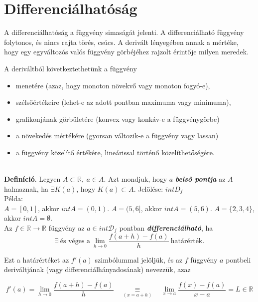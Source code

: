 \documentclass[12pt,margin=0px]{article}
\newcommand\ddfrac[2]{\frac{\displaystyle #1}{\displaystyle #2}}
\begin{document}
    \section*{Differenciálhatóság}

    \noindent A differenciálhatóság a függvény simaságát jelenti. A differenciálható függvény folytonos, és nincs rajta törés, csúcs. A derivált lényegében annak a mértéke, hogy egy egyváltozós valós függvény görbéjéhez rajzolt érintője milyen meredek.\\
    {\small
    \noindent A deriváltból következtethetünk a függvény
    \begin{itemize}
        \item menetére (azaz, hogy monoton növekvő vagy monoton fogyó-e),
        \item szélsőértékeire (lehet-e az adott pontban maximuma vagy minimuma),
        \item grafikonjának görbületére (konvex vagy konkáv-e a függvénygörbe)
        \item a növekedés mértékére (gyorsan változik-e a függvény vagy lassan)
        \item a függvény közelítő értékére, lineárissal történő közelíthetőségére.
    \end{itemize}
    }
    \ \\

    \noindent \textbf{Definíció}. Legyen $A \subset \mathbb{R},\ a \in A$. Azt mondjuk, hogy $a$ \textbf{\emph{belső pontja}} az $A$ halmaznak, ha $\exists K(a)$, hogy $K(a) \subset A$. Jelölése: $int D_f$\\

    \noindent Példa:\\
    $A = [0,1]$, akkor $int A = (0,1)$. $A = (5,6]$, akkor $int A = (5,6)$. $A = \{2,3,4\}$, akkor $int A = \emptyset$.\\

    \noindent Az $f \in \mathbb{R} \to \mathbb{R}$ függvény az $a \in int \mathcal{D}_f$ pontban \textbf{\emph{differenciálható}}, ha
    \[
        \exists\ \text{és véges a}\ \lim\limits_{h \to 0} \ddfrac{f(a + h)-f(a)}{h}\ \text{határérték.}
    \]

    \noindent Ezt a határértéket az $f'(a)$ szimbólummal jelöljük, és az $f$ függvény $a$ pontbeli deriváltjának (vagy differenciálhányadosának) nevezzük, azaz

    \[
        f'(a) = \lim\limits_{h \to 0} \ddfrac{f(a + h)-f(a)}{h}\quad \underset{(x = a + h)}{\equiv}\quad \lim\limits_{x \to a} \ddfrac{f(x) - f(a)}{x-a} = L \in \mathbb{R}
    \]
\end{document}
